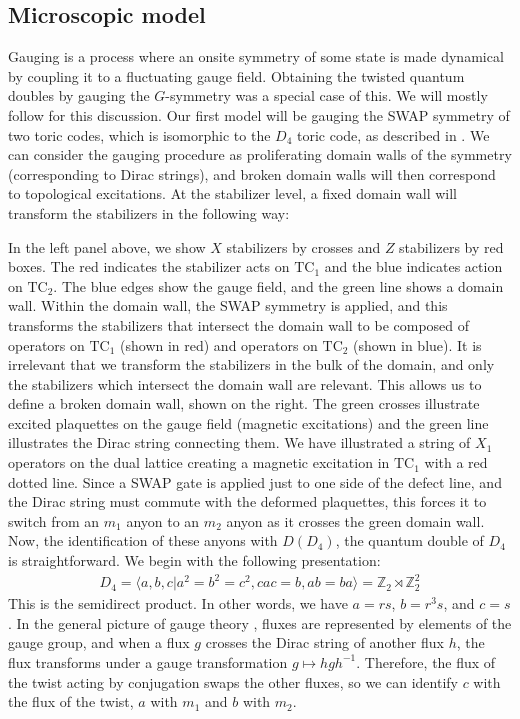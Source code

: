 \documentclass{article}
\theoremstyle{definition}
\theoremstyle{definition}
\newcommand{\Z}{\mathbb Z}
\newcommand{\TC}{\mathrm{TC}}
\begin{document}
\subsection{Microscopic model}
Gauging is a process where an onsite symmetry of some state is made dynamical by
coupling it to a fluctuating gauge field. Obtaining the twisted quantum doubles
by gauging the $G$-symmetry was a special case of this.
We will mostly
follow \cite{bombindelgado} for this discussion. Our first model
will be gauging the SWAP symmetry of two toric codes, which is isomorphic to the
$D_4$ toric code, as described in \cite{shortest_route}. We can consider the gauging procedure as
proliferating domain walls of the symmetry (corresponding to Dirac strings), and broken domain walls will then correspond to
topological excitations. At the stabilizer level, a fixed domain wall will
transform the stabilizers in the following way:
\begin{center}\label{fig:lattice_level_gauging_procedure}

\hspace{2cm}

\end{center}
In the left panel above, we show $X$ stabilizers by crosses and $Z$ stabilizers by red boxes. The
red indicates the stabilizer acts on $\TC_1$ and the blue indicates action on
$\TC_2$. The blue edges show the gauge field, and the green line
shows a domain wall. Within the domain wall, the SWAP symmetry is applied, and
this transforms the stabilizers that intersect the domain wall to be composed of
operators on $\TC_1$ (shown in red) and operators on $\TC_2$ (shown in blue).
It is irrelevant that we transform the stabilizers in the bulk of the domain,
and only the stabilizers which intersect the domain wall are relevant. This
allows us to define a broken domain wall, shown on the right.
The green crosses illustrate excited plaquettes on the gauge field (magnetic
excitations) and the green line illustrates the Dirac string connecting them. We
have illustrated a string of $X_1$ operators on the dual lattice creating a
magnetic excitation in $\TC_1$ with a red dotted line. Since a SWAP gate is
applied just to one side of the defect line, and the Dirac string must commute with
the deformed plaquettes, this forces it to switch from an $m_1$ anyon to an $m_2$
anyon as it crosses the green domain wall. Now, the identification of these
anyons with $D(D_4)$, the quantum double of $D_4$ is straightforward. We begin
with the following presentation:
\begin{align}
  D_4 = \langle  a,b,c| a^2 = b^2 = c^2, cac = b , ab = ba\rangle  =\Z_2 \rtimes \Z_2^2
\end{align}
This is the semidirect product.
In other words, we have $a = rs$, $b = r^3s$, and $c = s$.
In the general picture of gauge theory \cite{propitius}, fluxes are represented by elements of the gauge
group, and when a flux $g$ crosses the Dirac string of another flux $h$, the flux
transforms under a gauge transformation $g \mapsto hgh^{-1}$. Therefore, the
flux of the twist acting by conjugation swaps the other fluxes, so we can
identify $c$ with the flux of the twist, $a$ with $m_1$ and $b$ with $m_2$.
\end{document}

